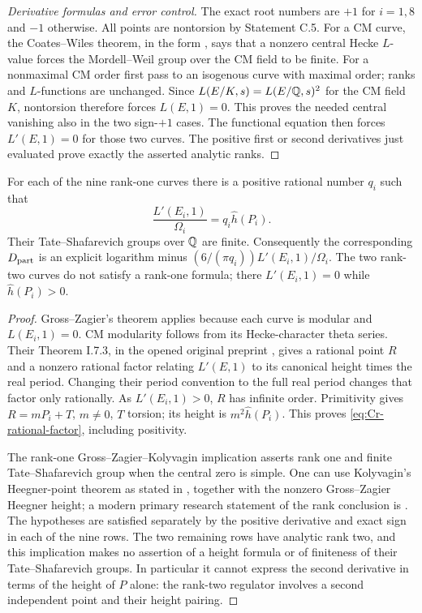 \begin{proof}[Derivative formulas and error control]
The exact root numbers are $+1$ for $i=1,8$ and $-1$ otherwise.
All points are nontorsion by Statement C.5. For a CM curve,
the Coates--Wiles theorem, in the form
\citet[Theorem 10.1]{CrRubin1999}, says that a nonzero central
Hecke $L$-value forces the Mordell--Weil group over the CM field
to be finite. For a nonmaximal CM order first pass to an isogenous
curve with maximal order; ranks and $L$-functions are unchanged.
Since $L(E/K,s)=L(E/\mathbb Q,s)^2$ for the CM field $K$, nontorsion
therefore forces $L(E,1)=0$. This proves the needed central
vanishing also in the two sign-$+1$ cases. The functional equation
then forces $L'(E,1)=0$ for those two curves. The positive first
or second derivatives just evaluated prove exactly the asserted
analytic ranks.
\end{proof}

\begin{statement}
For each of the nine rank-one curves there is a positive rational
number $q_i$ such that
\begin{equation}\label{eq:Cr-rational-factor}
 \frac{L'(E_i,1)}{\Omega_i}=q_i\widehat h(P_i).
\end{equation}
Their Tate--Shafarevich groups over $\mathbb Q$ are finite. Consequently
the corresponding $D_{\rm part}$ is an explicit logarithm minus
$(6/(\pi q_i))L'(E_i,1)/\Omega_i$. The two rank-two curves do
not satisfy a rank-one formula; there $L'(E_i,1)=0$ while
$\widehat h(P_i)>0$.
\end{statement}
\begin{proof}
Gross--Zagier's theorem applies because each curve is modular and
$L(E_i,1)=0$. CM modularity follows from its Hecke-character
theta series. Their Theorem I.7.3, in the opened original
preprint \citep{CrGrossZagier1986}, gives a rational point $R$ and
a nonzero rational factor relating $L'(E,1)$ to its canonical
height times the real period. Changing their period convention
to the full real period changes that factor only rationally.
As $L'(E_i,1)>0$, $R$ has infinite order. Primitivity gives
$R=mP_i+T$, $m\ne0$, $T$ torsion; its height is
$m^2\widehat h(P_i)$. This proves
\eqref{eq:Cr-rational-factor}, including positivity.

The rank-one Gross--Zagier--Kolyvagin implication asserts rank one
and finite Tate--Shafarevich group when the central zero is simple.
One can use Kolyvagin's Heegner-point theorem as stated in
\citet[Theorem 1.3]{CrGross1991}, together with the nonzero
Gross--Zagier Heegner height; a modern primary research statement
of the rank conclusion is \citet[Theorem 1.1]{CrJetchev2008}.
The hypotheses are satisfied separately by the positive derivative
and exact sign in each of the nine rows. The two remaining rows
have analytic rank two, and this implication makes no assertion
of a height formula or of finiteness of their Tate--Shafarevich
groups. In particular it cannot express the second derivative
in terms of the height of $P$ alone: the rank-two regulator involves
a second independent point and their height pairing.
\end{proof}


